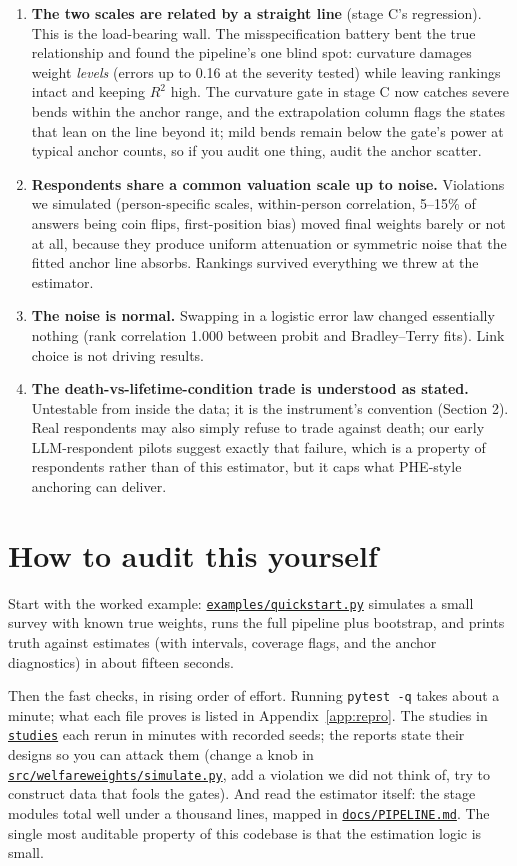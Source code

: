 \documentclass[11pt]{article}
\newcommand{\repo}{https://github.com/welfareweights/engine}
\newcommand{\src}[1]{\href{\repo/blob/main/#1}{\texttt{#1}}}
\begin{document}
\begin{enumerate}
\item \textbf{The two scales are related by a straight line} (stage C's regression). This is the load-bearing wall. The misspecification battery bent the true relationship and found the pipeline's one blind spot: curvature damages weight \emph{levels} (errors up to 0.16 at the severity tested) while leaving rankings intact and keeping $R^2$ high. The curvature gate in stage C now catches severe bends within the anchor range, and the extrapolation column flags the states that lean on the line beyond it; mild bends remain below the gate's power at typical anchor counts, so if you audit one thing, audit the anchor scatter.
\item \textbf{Respondents share a common valuation scale up to noise.} Violations we simulated (person-specific scales, within-person correlation, 5--15\% of answers being coin flips, first-position bias) moved final weights barely or not at all, because they produce uniform attenuation or symmetric noise that the fitted anchor line absorbs. Rankings survived everything we threw at the estimator.
\item \textbf{The noise is normal.} Swapping in a logistic error law changed essentially nothing (rank correlation 1.000 between probit and Bradley--Terry fits). Link choice is not driving results.
\item \textbf{The death-vs-lifetime-condition trade is understood as stated.} Untestable from inside the data; it is the instrument's convention (Section 2). Real respondents may also simply refuse to trade against death; our early LLM-respondent pilots suggest exactly that failure, which is a property of respondents rather than of this estimator, but it caps what PHE-style anchoring can deliver.
\end{enumerate}

\section{How to audit this yourself}

Start with the worked example: \src{examples/quickstart.py} simulates a small survey with known true weights, runs the full pipeline plus bootstrap, and prints truth against estimates (with intervals, coverage flags, and the anchor diagnostics) in about fifteen seconds.

Then the fast checks, in rising order of effort. Running \texttt{pytest -q} takes about a minute; what each file proves is listed in Appendix~\ref{app:repro}. The studies in \src{studies} each rerun in minutes with recorded seeds; the reports state their designs so you can attack them (change a knob in \src{src/welfareweights/simulate.py}, add a violation we did not think of, try to construct data that fools the gates). And read the estimator itself: the stage modules total well under a thousand lines, mapped in \src{docs/PIPELINE.md}. The single most auditable property of this codebase is that the estimation logic is small.
\end{document}

